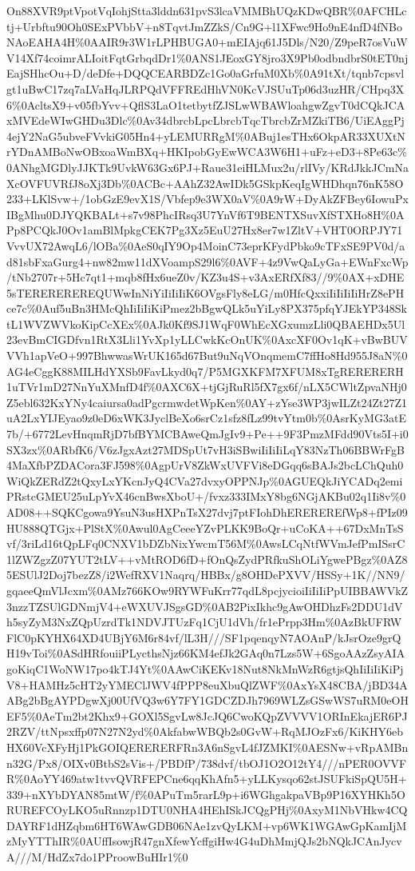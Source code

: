 \documentclass[]{article}
\begin{document}
On88XVR9ptVpotVqIohjStta3lddn631pvS3lcaVMMBhUQzKDwQBR\%0AFCHLctj+Urbftu90Oh0SExPVbbV+n8TqvtJmZZkS/Cn9G+l1XFwc9Ho9nE4nfD4fNBoNAoEAHA4H\%0AAIR9r3W1rLPHBUGA0+mEIAjq61J5Dls/N20/Z9peR7osVuWV14Xf74coimrALIoitFqtGrbqdDr1\%0ANS1JEoxGY8jro3X9Pb0odbndbrS0tET0njEajSHhcOu+D/deDfe+DQQCEARBDZc1Go0aGrfuM0Xb\%0A91tXt/tqnb7cpsvlgt1uBwC17zq7aLVaHqJLRPQdVFFREdHhVN0KcVJSUuTp06d3uzHR/CHpq3X6\%0AcltsX9+v05fbYvv+QflS3LaO1tetbytfZJSLwWBAWloahgwZgvT0dCQkJCAxMVEdeWIwGHDu3Dlc\%0Av34dbrcbLpcLbrcbTqcTbrcbZrMZkiTB6/UiEAggPj4ejY2NaG5ubveFVvkiG05Hn4+yLEMURRgM\%0ABuj1esTHx6OkpAR33XUXtNrYDnAMBoNwOBxoaWmBXq+HKIpobGyEwWCA3W6H1+uFz+eD3+8Pe63c\%0ANhgMGDlyJJKTk9UvkW63Gx6PJ+Raue31eiHLMux2u/rlIVy/KRdJkkJCmNaXcOVFUVRfJ8oXj3Db\%0ACBc+AAhZ32AwIDk5GSkpKeqIgWHDhqn76nK58O233+LKlSvw+/1obGzE9evX1S/Vbfep9e3WX0aV\%0A9rW+DyAkZFBey6IowuPxIBgMhu0DJYQKBALt+s7v98PhcIRsq3U7YnVf6T9BENTXSuvXfSTXHo8H\%0APp8PCQkJ0Ov1amBlMpkgCEK7Pg3Xz5EuU27Hx8er7w1ZltV+VHT0ORPJY71VvvUX72AwqL6/lOBa\%0AeS0qIY9Op4MoinC73eprKFydPbko9cTFxSE9PV0d/ad81sbFxaGurg4+nw82mw11dXVoampS29l6\%0AVF+4z9VwQaLyGa+EWnFxcWp/tNb2707r+5Hc7qt1+mqb8fHx6ueZ0v/KZ3u4S+v3AxERfXf83//9\%0AX+xDHE5sTEREREREREQUWwInNiYiIiIiIiK6OVgsFly8eLG/m0HfcQxxiIiIiIiIiHrZ8ePHce7c\%0Auf5uBn3HMcQhIiIiIiKiPmez2bBgwQLk5uYiLy8PX375pfqYJEkYP348SktL1WVZWVkoKipCcXEx\%0AJk0Kf9SJ1WqF0WhEcXGxumzLli0QBAEHDx5Ul23evBmCIGDfvn1RtX3Lli1YvXp1yLLCwkKcOnUK\%0AxcXF0Ov1qK+vBwBUVVVh1apVeO+997BhwwasWrUK165d67But9uNqVOnqmemC7ffHo8Hd955J8aN\%0AG4eCggK88MILHdYXSb9FavLkyd0q7/P5MGXKFM7XFUM8xTgRERERERH1uTVr1mD27NnYuXMnfD4f\%0AXC6X+tjGjRuRl5fX7gx6f/nLX5CWltZpvaNHj0Z5ebl632KxYNy4caiursa0adPgcrmwdetWpKen\%0AY+zYse3WP3jwILZt24Zt27Z1uA2LxYIJEyao9z0eD6xWK3JyclBeXo6srCz1sfz8fLz99tvYtm0b\%0AsrKyMG3atE7b/+6772LevHnqmRjD7bfBYMCBAweQmJgIv9+Pe++9F3PmzMFdd90Vts5I+i0SX3zx\%0ARbfK6/V6zJgxAzt27MDSpUt7vH3iSBwiIiIiIiLqY83NzTh06BBWrFgB4MaXfbPZDACora3FJ598\%0AgpUrV8ZkWxUVFVi8eDGqq6sBAJs2bcLChQuh0WiQkZERdZ2tQxyLxYKcnJyQ4CVa27dvxyOPPNJp\%0AGUEQkJiYCADq2emiPRstcGMEU25uLpYvX46cnBwsXboU+/fvxz333IMxY8bg6NGjAKBu02q1Ii8v\%0AD08++SQKCgowa9YsuN3usHXPnTsX27dvj7ptFIohDhEREREREfWp8+fPIz09HU888QTGjx+PlStX\%0Awul0AgCeeeYZvPLKK9BoQr+uCoKA++67DxMnTsSvf/3riLd16tQpLFq0CNXV1bDZbNixYwcmT56M\%0AwsLCqNtfWVmJefPmISsrC1lZWZgzZ07YUT2tLV++vMtROD6fD+fOnQsZydPRfkuShOLiYgwePBgz\%0AZ85ESUlJ2Doj7bezZ8/i2WefRXV1Naqrq/HBBx/g8OHDePXVV/HSSy+1K//NN9/gqaeeQmVlJcxm\%0AMz766KOw9RYWFuKrr77qdL8pcjycioiIiIiIiPpUIBBAWVkZ3nzzTZSUlGDNmjV4+eWXUVJSgsGD\%0AB2PixIkhc9gAwOHDhzFs2DDU1dVh5syZyM3NxZQpUzrdTk1NDVJTUzFq1CjU1dVh/fr1ePrpp3Hm\%0AzBkUFRWFlC0pKYHX64XD4UBjY6M6r84vf/lL3H///SF1pqenqyN7AOAnP/kJsrOze9grQH19vToi\%0ASdHRfouiiPLycthsNjz66KM4efJk2GAq0n7Lzs5W+6SgoAAzZsyAIAgoKiqC1WoNW17po4kTJ4Yt\%0AAwCiKEKv18Nut8NkMnWzR6gtjsQhIiIiIiKiPjV8+HAMHz5cHT2yYMEClJWV4fPPP8euXbuQlZWF\%0AxYsX48CBA/jBD34AABg2bBgAYPDgwXj00UfVQ3w6Y7FY1GDCZDJh7969WLZsGSwWS7uRM0eOHEF5\%0AeTm2bt2Khx9+GOXl5SgvLw8JcJQ6CwoKQpZVVVV1ORInEkajER6PJ2RZV/ttNpsxffp07N27N2yd\%0AkfabwWBQb2s0GvW+RqMJOzFx6/KiKHY6ebHX60VcXFyHj1PkGOIQERERERFRn3A6nSgvL4fJZMKI\%0AESNw+vRpAMBnn32G/Px8/OIXv0BtbS2sVis+/PBDfP/738dvf/tbOJ1O2O12tY4///nPER0OVVFR\%0AoYY469atw1tvvQVRFEPCne6qqKhAfn5+yLLKysqo62stJSUFkiSpQU5H+339+nXYbDYAN85mtW/f\%0APuTm5rarL9p+i6WGhgakpaVBp9P16XYHKh5ORUREFCOyLKO5uRnnzp1DTU0NHA4HEhISkJCQgPHj\%0AxyM1NbVHkw4CQDAYRF1dHZqbm6HT6WAwGDB06NAe1zvQyLKM+vp6WK1WGAwGpKamIjMzMyYTThIR\%0AUffIsowjR47gnXfewYcffgiHw4G4uDhMmjQJs2bNQkJCAnJycvA///M/HdZx7do1PProowBuHIr1\%0
\end{document}
